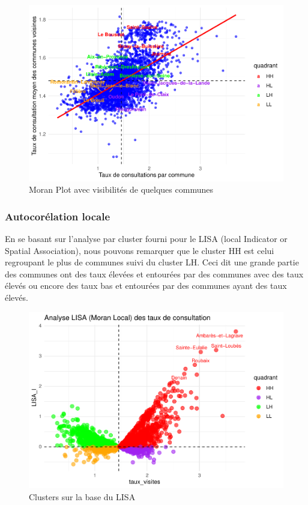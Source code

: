 \documentclass[
]{article}
\begin{document}
\begin{figure}

{\centering \includegraphics{4_Analyse_Descriptive_files/figure-latex/unnamed-chunk-19-1} 

}

\caption{Moran Plot avec visibilités de quelques communes}\label{fig:unnamed-chunk-19}
\end{figure}

\hypertarget{autocoruxe9lation-locale}{%
\subsubsection{Autocorélation locale}\label{autocoruxe9lation-locale}}

En se basant sur l'analyse par cluster fourni pour le LISA (local
Indicator or Spatial Association), nous pouvons remarquer que le cluster
HH est celui regroupant le plus de communes suivi du cluster LH. Ceci
dit une grande partie des communes ont des taux élevées et entourées par
des communes avec des taux élevés ou encore des taux bas et entourées
par des communes ayant des taux élevés.

\begin{figure}

{\centering \includegraphics{4_Analyse_Descriptive_files/figure-latex/unnamed-chunk-20-1} 

}

\caption{Clusters sur la base du LISA}\label{fig:unnamed-chunk-20}
\end{figure}
\end{document}
